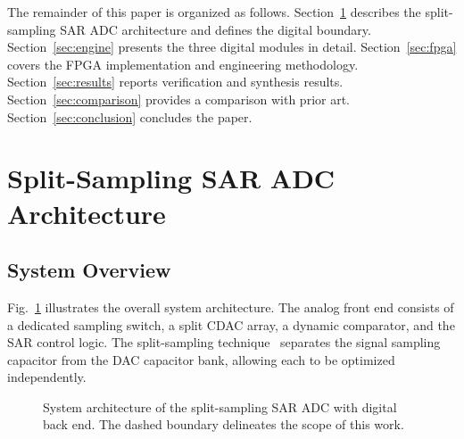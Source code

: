 \documentclass[journal]{IEEEtran}
\begin{document}
The remainder of this paper is organized as follows. Section~\ref{sec:arch}
describes the split-sampling SAR ADC architecture and defines the digital
boundary. Section~\ref{sec:engine} presents the three digital modules in
detail. Section~\ref{sec:fpga} covers the FPGA implementation and engineering
methodology. Section~\ref{sec:results} reports verification and synthesis
results. Section~\ref{sec:comparison} provides a comparison with prior art.
Section~\ref{sec:conclusion} concludes the paper.

\section{Split-Sampling SAR ADC Architecture}
\label{sec:arch}

\subsection{System Overview}

Fig.~\ref{fig:system_block} illustrates the overall system architecture. The
analog front end consists of a dedicated sampling switch, a split CDAC array,
a dynamic comparator, and the SAR control logic. The split-sampling
technique~\cite{huang_jssc_2025,huang_cicc_2024} separates the signal
sampling capacitor from the DAC capacitor bank, allowing each to be optimized
independently.

\begin{figure}[!t]
\centering
{}
\caption{System architecture of the split-sampling SAR ADC with digital back
end. The dashed boundary delineates the scope of this work.}
\label{fig:system_block}
\end{figure}
\end{document}
